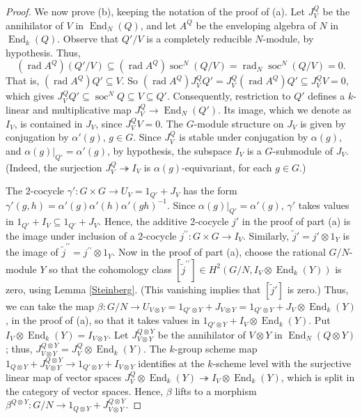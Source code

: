 \documentclass[11pt,leqno,amscd,amssymb,verbatim, url]{amsart}
\theoremstyle{definition}
\numberwithin{equation}{thm}
\newcommand{\End}{\operatorname{End}}
\newcommand{\soc}{\operatorname{soc}}
\newcommand{\rad}{\operatorname{rad}}
\begin{document}
\begin{proof}
   We now prove (b), keeping the notation of the proof of (a). Let $J^Q_V$ be the annihilator of $V$ in
   $\End_N(Q)$, and let $A^Q$ be the enveloping algebra of $N$ in $\End_k(Q)$. Observe that $Q'/V$ is a completely reducible $N$-module, by hypothesis. Thus, 
   $$(\rad A^Q)(Q'/V)\subseteq(\rad A^Q)\soc^N(Q/V)=\rad_N\soc^N(Q/V)=0.$$
   That is, $(\rad A^Q)Q'\subseteq V$. So $(\rad A^Q)J^Q_VQ'= J^Q_V(\rad A^Q)Q'\subseteq J^Q_VV=0,$
   which gives $J^Q_VQ'\subseteq\soc^NQ\subseteq V\subseteq Q'$. Consequently, restriction
   to $Q'$ defines a $k$-linear and multiplicative map $J^Q_V\to\End_N(Q')$. Its image, which we denote
   as $I_V$, is contained in $J_V$, since $J^Q_VV=0$. The $G$-module structure on $J_V$ is given by
   conjugation by $\alpha'(g)$, $g\in G$. Since $J^Q_V$ is stable under conjugation by $\alpha(g)$, and
   $\alpha(g)|_{Q'}=\alpha'(g)$, by hypothesis, the subspace $I_V$ is a $G$-submodule of $J_V$. (Indeed, the surjection
   $J^Q_V\twoheadrightarrow I_V$ is $\alpha(g)$-equivariant, for each $g\in G$.)
   
The $2$-cocycle $\gamma':G\times G\to U_V=1_{Q'}+J_V$ has the form $\gamma'(g,h)=\alpha'(g)\alpha'(h)\alpha'(gh)^{-1}$. Since $\alpha(g)|_{Q'}=\alpha'(g)$, $\gamma'$  takes values in $1_{Q'}+I_V\subseteq 1_{Q'}+J_V$. Hence, the additive 2-cocycle $j'$ in the proof of part (a) is the image under inclusion
of a $2$-cocycle $j^{\prime\prime}:G\times G\to I_V$. Similarly, $\widetilde j'=j'\otimes1_Y$ is the image of
$\widetilde j^{\prime\prime}=j^{\prime\prime}\otimes 1_Y$. Now in the proof of part (a), choose the
  rational $G/N$-module $Y$ so that the cohomology class $[\widetilde j^{\prime\prime}]\in H^2(G/N,
I_V\otimes\End_k(Y))$ is zero, using Lemma \ref{Steinberg}.  (This vanishing implies that
$[\widetilde j']$ is zero.) Thus, we can take the map $\beta:G/N\to
U_{V\otimes Y}=1_{Q'\otimes Y}+J_{V\otimes Y}=1_{Q'\otimes Y}+J_V\otimes\End_k(Y)$, in the proof of (a), so that it takes values in $1_{Q'\otimes Y}+ I_{V}\otimes\End_k(Y)$.  Put $I_V\otimes \End_k(Y)=I_{V\otimes Y}$. Let $J^{Q\otimes Y}_{V\otimes Y}$ be
the annihilator of $V\otimes Y$ in $\End_N(Q\otimes Y)$; thus, $J^{Q\otimes Y}_{V\otimes Y}=J_V^Q\otimes
\End_k(Y)$. The $k$-group scheme map $1_{Q\otimes Y}+J^{Q\otimes Y}_{V\otimes Y}\to 1_{Q'\otimes Y}+ I_{V\otimes Y}$ identifies at the $k$-scheme level with the surjective linear map of vector spaces
 $J^{Q}_{V}\otimes\End_k(Y)\twoheadrightarrow I_V\otimes\End_k(Y)$,
which is split in the category of vector spaces. Hence, $\beta$ lifts to a morphism $\beta^{Q\otimes Y}:G/N\to 1_{Q\otimes Y}+J^{Q\otimes Y}_{V\otimes Y}$. 


\end{proof}
\end{document}
